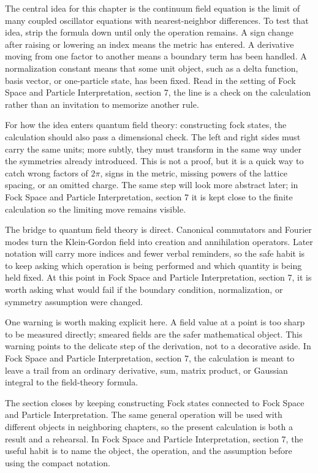 The central idea for this chapter is the continuum field equation is the limit of many coupled oscillator equations with nearest-neighbor differences.  To test that idea, strip the formula down until only the operation remains.  A sign change after raising or lowering an index means the metric has entered.  A derivative moving from one factor to another means a boundary term has been handled.  A normalization constant means that some unit object, such as a delta function, basis vector, or one-particle state, has been fixed.  Read in the setting of Fock Space and Particle Interpretation, section 7, the line is a check on the calculation rather than an invitation to memorize another rule.

For how the idea enters quantum field theory: constructing fock states, the calculation should also pass a dimensional check.  The left and right sides must carry the same units; more subtly, they must transform in the same way under the symmetries already introduced.  This is not a proof, but it is a quick way to catch wrong factors of \(2\pi\), signs in the metric, missing powers of the lattice spacing, or an omitted charge.  The same step will look more abstract later; in Fock Space and Particle Interpretation, section 7 it is kept close to the finite calculation so the limiting move remains visible.

The bridge to quantum field theory is direct.  Canonical commutators and Fourier modes turn the Klein-Gordon field into creation and annihilation operators.  Later notation will carry more indices and fewer verbal reminders, so the safe habit is to keep asking which operation is being performed and which quantity is being held fixed.  At this point in Fock Space and Particle Interpretation, section 7, it is worth asking what would fail if the boundary condition, normalization, or symmetry assumption were changed.

One warning is worth making explicit here.  A field value at a point is too sharp to be measured directly; smeared fields are the safer mathematical object.  This warning points to the delicate step of the derivation, not to a decorative aside.  In Fock Space and Particle Interpretation, section 7, the calculation is meant to leave a trail from an ordinary derivative, sum, matrix product, or Gaussian integral to the field-theory formula.

The section closes by keeping constructing Fock states connected to Fock Space and Particle Interpretation.  The same general operation will be used with different objects in neighboring chapters, so the present calculation is both a result and a rehearsal.  In Fock Space and Particle Interpretation, section 7, the useful habit is to name the object, the operation, and the assumption before using the compact notation.



